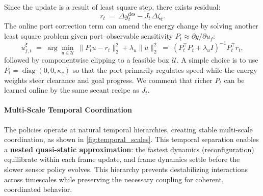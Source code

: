 \documentclass{article} %
\begin{document}
Since the update is a result of least square step, there exists residual:
\[
r_t \;=\; \Delta y^{\mathrm{des}}_t - J_t\,\Delta\zeta_t.
\]
The online port correction term can amend the energy change by solving another least square problem given port–observable sensitivity $P_t\approx\partial y/\partial u_f$:
\[
u_{f,t}^{\xi}
\;=\;\arg\min_{u\in\mathcal U}\ \big\|P_t u - r_t\big\|_2^2+\lambda_u\|u\|_2^2
\;=\;(P_t^\top P_t+\lambda_u I)^{-1}P_t^\top r_t,
\]
followed by componentwise clipping to a feasible box $\mathcal U$.
A simple choice is to use $P_t=\operatorname{diag}(0,0,\kappa_v)$ so that the port primarily regulates speed while the energy weights steer clearance and goal progress. We comment that richer $P_t$ can be learned online by the same secant recipe as $J_t$.



\paragraph{Multi-Scale Temporal Coordination}
\label{subsec:temporal_coordination}

The policies operate at natural temporal hierarchies, creating stable multi-scale coordination, as shown in \cref{fig:temporal_scales}. This temporal separation enables a \textbf{nested quasi-static approximation}: the fastest dynamics (reconfiguration) equilibrate within each frame update, and frame dynamics settle before the slower sensor policy evolves.
This hierarchy prevents destabilizing interactions across timescales 
while preserving the necessary coupling for coherent, coordinated behavior.
\end{document}
